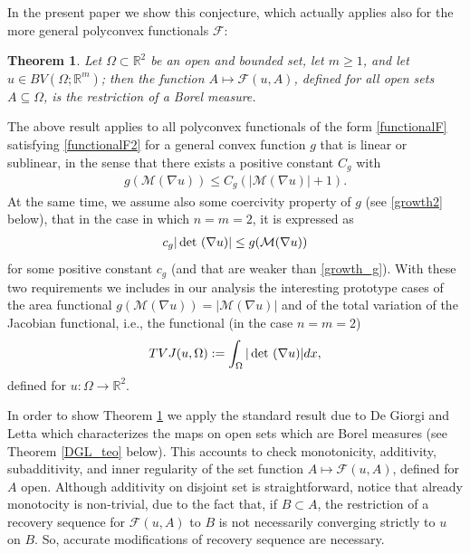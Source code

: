 \documentclass[a4paper,11pt]{article}
\numberwithin{equation}{section}
\newtheorem{theorem}{Theorem}[section]
\newcommand{\Om}{\Omega}
\def\det{\,{\rm det\ }}
\newcommand{\R}{\mathbb{R}}
\begin{document}
 In the present paper we show this conjecture, which actually applies also for the more general polyconvex functionals $\mathcal F$:

\begin{theorem}\label{teo_main1}
Let $\Om\subset\R^2$ be an open and bounded set, let $m\geq 1$, and let $u\in BV(\Om;\R^m)$; then the function $A\mapsto \mathcal F(u,A)$, defined for all open sets $A\subseteq\Om$, is the restriction of a Borel measure. 
\end{theorem}

The above result applies to all polyconvex functionals of the form \eqref{functionalF} satisfying \eqref{functionalF2} for a general convex function $g$ that is linear or sublinear, in the sense that there exists a positive constant $C_g$ with 
\begin{align}\label{growth1_intro}
g(\mathcal M(\nabla u))\leq C_g(|\mathcal M(\nabla u)|+1).
\end{align}
At the same time, we assume also some coercivity property of $g$ (see \eqref{growth2} below), that in the case in which $n=m=2$, it is expressed as
\begin{align}\label{growth2_intro}
c_g|\det(\nabla u)|\leq g(\mathcal M(\nabla u))
\end{align}
for some positive constant $c_g$ (and that are weaker than \eqref{growth_g}).
With these two requirements we includes in our analysis the interesting prototype cases of the area functional $g(\mathcal M(\nabla u))=|\mathcal M(\nabla u)|$ and of the total variation of the Jacobian functional, i.e., the functional (in the case $n=m=2$)
\begin{align}\label{TVJ}
TVJ(u,\Om):=\int_\Om|\det(\nabla u)|dx,
\end{align}
defined for $u:\Om\rightarrow \R^2$.

In order to show Theorem \ref{teo_main1} we apply the standard result due to De Giorgi and Letta which characterizes the maps on open sets which are Borel measures  (see Theorem \ref{DGL_teo} below). 
This accounts to check monotonicity, additivity, subadditivity, and inner regularity of the set function $A\mapsto \mathcal F(u,A)$, defined for $A$ open. Although additivity on disjoint set is straightforward, notice that already monotocity is non-trivial, due to the fact that, if $B\subset A$, the restriction of a recovery sequence for $\mathcal F(u,A)$ to $B$ is not necessarily converging strictly to $u$ on $B$. So, accurate modifications of recovery sequence are necessary.
\end{document}
